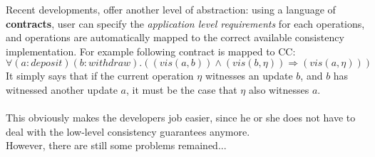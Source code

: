 \documentclass[runningheads]{llncs}
\begin{document}
Recent developments, offer another level of abstraction: using a language of {\bf contracts}, user can specify the \emph{application level requirements} for each operations, and operations are automatically mapped to the correct available consistency implementation. For example following contract is mapped to CC: 
$$\forall (a:deposit) (b:withdraw). 
 ((vis(a,b))\wedge(vis(b,\eta)) \Rightarrow (vis(a,\eta)))$$
It simply says that if the current operation $\eta$ witnesses an update $b$, and $b$ has witnessed another update $a$, it must be the case that $\eta$ also witnesses $a$. 

\paragraph{}
This obviously makes the developers job easier, since he or she does not have to deal with the  low-level consistency guarantees anymore. \\However, there are still some problems remained...
\end{document}
